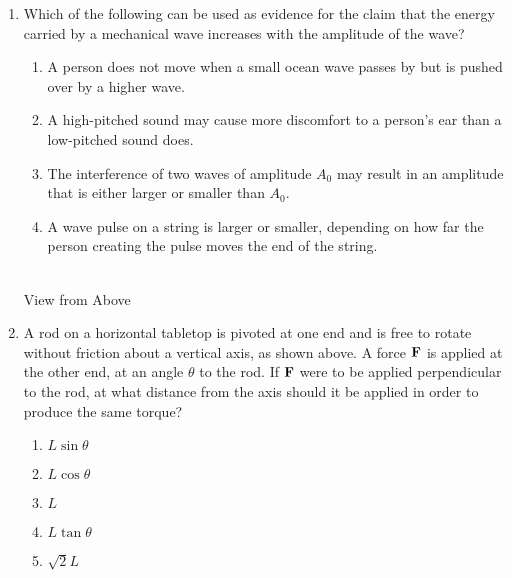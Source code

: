 \documentclass[11pt]{article}
\newcommand{\mb}[1]{\ensuremath\mathbf{#1}}
\begin{document}
\begin{multicols}{2}
\begin{enumerate}[leftmargin=18pt,resume]
  \item Which of the following can be used as evidence for the claim that the
    energy carried by a mechanical wave increases with the amplitude of the
    wave?
    \begin{enumerate}[nosep,leftmargin=18pt,label=(\Alph*)]
    \item A person does not move when a small ocean wave passes by but is pushed
      over by a higher wave.
    \item A high-pitched sound may cause more discomfort to a person's ear than
      a low-pitched sound does.
    \item The interference of two waves of amplitude $A_0$ may result in an
      amplitude that is either larger or smaller than $A_0$.
    \item A wave pulse on a string is larger or smaller, depending on how far
      the person creating the pulse moves the end of the string.
    \end{enumerate}
    \vspace{.7in}
    
    \begin{center}
      \\
      View from Above
    \end{center}
  \item A rod on a horizontal tabletop is pivoted at one end and is free to
    rotate without friction about a vertical axis, as shown above. A force
    $\mb{F}$ is applied at the other end, at an angle $\theta$ to the rod. If
    $\mb{F}$ were to be applied perpendicular to the rod, at what distance from
    the axis should it be applied in order to produce the same torque?
    \begin{enumerate}[nosep,leftmargin=18pt,label=(\Alph*)]
    \item$L\sin\theta$
    \item$L\cos\theta$
    \item$L$
    \item$L\tan\theta$
    \item$\sqrt{2}L$
    \end{enumerate}
    

\end{enumerate}
\end{multicols}
\end{document}
